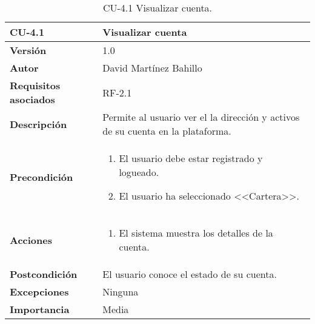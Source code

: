 \begin{table}[p]
	\centering
	\begin{tabularx}{\linewidth}{ p{} p{} }
		\toprule
		\textbf{CU-4.1}  & \textbf{Visualizar cuenta}\\
		\midrule
		\textbf{Versión}              & 1.0    \\
		\textbf{Autor}                & David Martínez Bahillo \\
		\textbf{Requisitos asociados} & RF-2.1 \\
		\textbf{Descripción}          & Permite al usuario ver el la dirección y activos de su cuenta en la plataforma. \\
		\textbf{Precondición}         &  
		\begin{enumerate}
			\def\labelenumi{\arabic{enumi}.}
			\tightlist
			\item El usuario debe estar registrado y logueado.
			\item El usuario ha seleccionado <<Cartera>>.
		\end{enumerate}\\
		\textbf{Acciones}             &
		\begin{enumerate}
			\def\labelenumi{\arabic{enumi}.}
			\tightlist
			\item El sistema muestra los detalles de la cuenta.
		\end{enumerate}\\
		\textbf{Postcondición}        & El usuario conoce el estado de su cuenta. \\
		\textbf{Excepciones}          & Ninguna \\
		\textbf{Importancia}          & Media  \\
		\bottomrule
	\end{tabularx}
	\caption{CU-4.1 Visualizar cuenta.}
\end{table}


